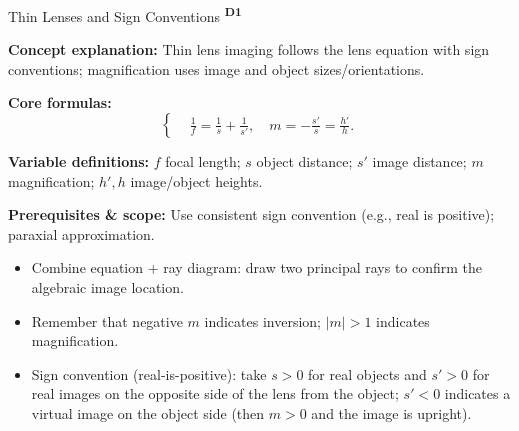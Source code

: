 ﻿\documentclass[12pt,a4paper]{article}
\providecommand{\KPFormulas}{}
\providecommand{\KPHeuristics}{}
\newcommand{\DOne}{\texorpdfstring{\textsuperscript{\textbf{D1}}}{ D1}}
\begin{document}
\begin{KnowledgePoint}{Thin Lenses and Sign Conventions \DOne}
  \KPFormulas
  \begin{formulabox}
  \textbf{Concept explanation:} Thin lens imaging follows the lens equation with sign conventions; magnification uses image and object sizes/orientations.
  
  \textbf{Core formulas:}
  \[
  \left\{\begin{aligned}
    &\frac{1}{f}=\frac{1}{s}+\frac{1}{s'},\quad m=-\frac{s'}{s}=\frac{h'}{h}.
  \end{aligned}\right.
  \]

  \textbf{Variable definitions:} $f$ focal length; $s$ object distance; $s'$ image distance; $m$ magnification; $h',h$ image/object heights.

  \textbf{Prerequisites \& scope:} Use consistent sign convention (e.g., real is positive); paraxial approximation.
  \end{formulabox}

  \KPHeuristics
  \begin{heuristicsbox}
  \begin{itemize}[leftmargin=*]
    \item Combine equation + ray diagram: draw two principal rays to confirm the algebraic image location.
    \item Remember that negative $m$ indicates inversion; $|m|>1$ indicates magnification.
    \item Sign convention (real-is-positive): take $s>0$ for real objects and $s'>0$ for real images on the opposite side of the lens from the object; $s'<0$ indicates a virtual image on the object side (then $m>0$ and the image is upright).
  \end{itemize}
  \end{heuristicsbox}


\end{KnowledgePoint}
\end{document}
